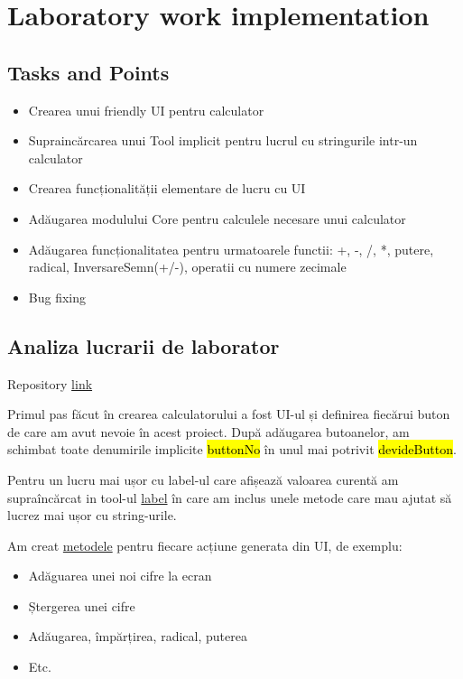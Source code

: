 \section{Laboratory work implementation}

\subsection{Tasks and Points}

\begin{itemize}
	\item Crearea unui friendly UI pentru calculator
	\item Supraincărcarea unui Tool implicit pentru lucrul cu stringurile intr-un calculator
	\item Crearea funcționalității elementare de lucru cu UI
	\item Adăugarea modulului Core pentru calculele necesare unui calculator
	\item Adăugarea funcționalitatea pentru urmatoarele functii: +, -, /, *, putere, radical, InversareSemn(+/-), operatii cu numere zecimale
	\item Bug fixing
\end{itemize}

\subsection{Analiza lucrarii de laborator}
Repository \href{https://github.com/AScripnic/MIDPS-laboratories/tree/master/Lab%232}{link}\par

Primul pas făcut în crearea calculatorului a fost UI-ul și definirea fiecărui buton de care am avut nevoie în acest proiect. După adăugarea butoanelor, am schimbat toate denumirile implicite \hl{buttonNo} în unul mai potrivit \hl{devideButton}. \par

Pentru un lucru mai ușor cu label-ul care afișează valoarea curentă am supraîncărcat in tool-ul \href{https://github.com/AScripnic/MIDPS-laboratories/blob/master/Lab%232/Core/Core/ExtendedLabel.cs}{label} în care am inclus unele metode care mau ajutat să lucrez mai ușor cu string-urile. \par

Am creat \href{https://github.com/AScripnic/MIDPS-laboratories/blob/master/Lab%232/Calculator/Calculator/Form1.cs}{metodele} pentru fiecare acțiune generata din UI, de exemplu:
\begin{itemize}
	\item Adăguarea unei noi cifre la ecran
	\item Ștergerea unei cifre
	\item Adăugarea, împărțirea, radical, puterea
	\item Etc.
\end{itemize}

